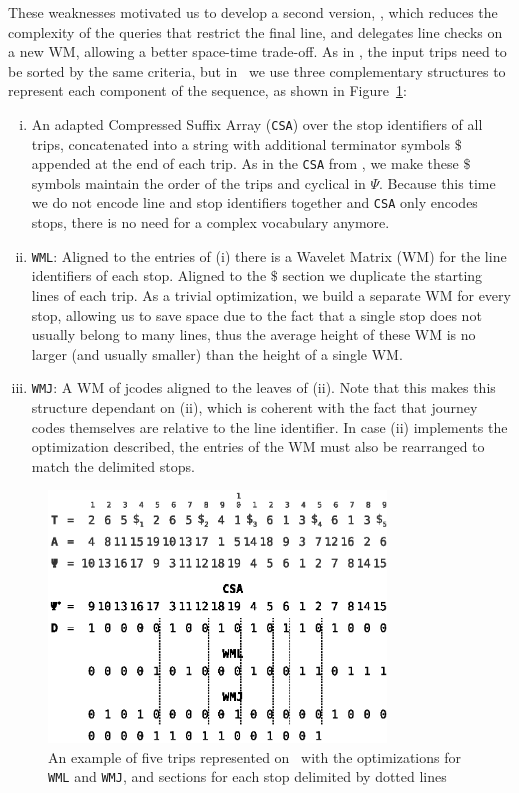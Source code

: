     These weaknesses motivated us to develop a second version, \ctr, which reduces the complexity of the queries that restrict the final line, and delegates line checks on a new WM, allowing a better space-time trade-off. As in \ttctr, the input trips need to be sorted by the same criteria, but in \ctr~we use three complementary structures to represent each component of the sequence, as shown in Figure~\ref{fig:example_xctr}:
    \begin{enumerate}[(i)]
        \item An adapted Compressed Suffix Array (\texttt{CSA}) over the stop identifiers of all trips, concatenated into a string with additional terminator symbols $\$$ appended at the end of each trip. As in the \texttt{CSA} from \ttctr, we make these $\$$ symbols maintain the order of the trips and cyclical in $\Psi$. Because this time we do not encode line and stop identifiers together and \texttt{CSA} only encodes stops, there is no need for a complex vocabulary anymore.
        \item \texttt{WML}: Aligned to the entries of (i) there is a Wavelet Matrix (WM) for the line identifiers of each stop. Aligned to the $\$$ section we duplicate the starting lines of each trip. As a trivial optimization, we build a separate WM for every stop, allowing us to save space due to the fact that a single stop does not usually belong to many lines, thus the average height of these WM is no larger (and usually smaller) than the height of a single WM.
        \item \texttt{WMJ}: A WM of jcodes aligned to the leaves of (ii). Note that this makes this structure dependant on (ii), which is coherent with the fact that journey codes themselves are relative to the line identifier. In case (ii) implements the optimization described, the entries of the WM must also be rearranged to match the delimited stops.
    \end{enumerate}
    
    \begin{figure}[ht]
    \begin{center}
    \includegraphics[width=0.8\textwidth]{figures/example_xctr.eps}
    \caption{An example of five trips represented on \ctr~with the optimizations for \texttt{WML} and \texttt{WMJ}, and sections for each stop delimited by dotted lines}
    \label{fig:example_xctr}
    \end{center}
    \end{figure}
    

